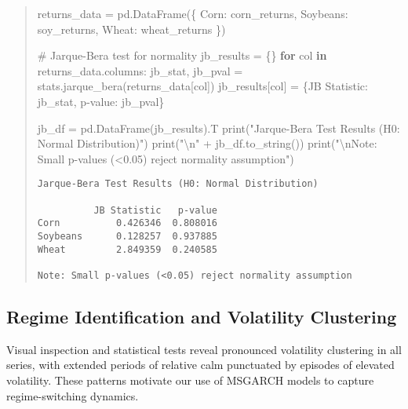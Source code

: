 \documentclass[
  10pt,
  a4paper,
]{article}
\newenvironment{Shaded}{\begin{snugshade}}{\end{snugshade}}
\newcommand{\BuiltInTok}[1]{\textcolor[rgb]{0.00,0.23,0.31}{#1}}
\newcommand{\CharTok}[1]{\textcolor[rgb]{0.13,0.47,0.30}{#1}}
\newcommand{\CommentTok}[1]{\textcolor[rgb]{0.37,0.37,0.37}{#1}}
\newcommand{\ControlFlowTok}[1]{\textcolor[rgb]{0.00,0.23,0.31}{\textbf{#1}}}
\newcommand{\KeywordTok}[1]{\textcolor[rgb]{0.00,0.23,0.31}{\textbf{#1}}}
\newcommand{\NormalTok}[1]{\textcolor[rgb]{0.00,0.23,0.31}{#1}}
\newcommand{\OperatorTok}[1]{\textcolor[rgb]{0.37,0.37,0.37}{#1}}
\newcommand{\StringTok}[1]{\textcolor[rgb]{0.13,0.47,0.30}{#1}}
\begin{document}
\begin{tcolorbox}
\begin{quote}
\begin{Shaded}
\begin{Highlighting}[]
\NormalTok{returns\_data }\OperatorTok{=}\NormalTok{ pd.DataFrame(\{}
    \StringTok{\textquotesingle{}Corn\textquotesingle{}}\NormalTok{: corn\_returns,}
    \StringTok{\textquotesingle{}Soybeans\textquotesingle{}}\NormalTok{: soy\_returns,}
    \StringTok{\textquotesingle{}Wheat\textquotesingle{}}\NormalTok{: wheat\_returns}
\NormalTok{\})}

\CommentTok{\# Jarque{-}Bera test for normality}
\NormalTok{jb\_results }\OperatorTok{=}\NormalTok{ \{\}}
\ControlFlowTok{for}\NormalTok{ col }\KeywordTok{in}\NormalTok{ returns\_data.columns:}
\NormalTok{    jb\_stat, jb\_pval }\OperatorTok{=}\NormalTok{ stats.jarque\_bera(returns\_data[col])}
\NormalTok{    jb\_results[col] }\OperatorTok{=}\NormalTok{ \{}\StringTok{\textquotesingle{}JB Statistic\textquotesingle{}}\NormalTok{: jb\_stat, }\StringTok{\textquotesingle{}p{-}value\textquotesingle{}}\NormalTok{: jb\_pval\}}

\NormalTok{jb\_df }\OperatorTok{=}\NormalTok{ pd.DataFrame(jb\_results).T}
\BuiltInTok{print}\NormalTok{(}\StringTok{"Jarque{-}Bera Test Results (H0: Normal Distribution)"}\NormalTok{)}
\BuiltInTok{print}\NormalTok{(}\StringTok{"}\CharTok{\textbackslash{}n}\StringTok{"} \OperatorTok{+}\NormalTok{ jb\_df.to\_string())}
\BuiltInTok{print}\NormalTok{(}\StringTok{"}\CharTok{\textbackslash{}n}\StringTok{Note: Small p{-}values (\textless{}0.05) reject normality assumption"}\NormalTok{)}
\end{Highlighting}
\end{Shaded}

\begin{verbatim}
Jarque-Bera Test Results (H0: Normal Distribution)

          JB Statistic   p-value
Corn          0.426346  0.808016
Soybeans      0.128257  0.937885
Wheat         2.849359  0.240585

Note: Small p-values (<0.05) reject normality assumption
\end{verbatim}
\end{quote}

\subsection{Regime Identification and Volatility
Clustering}\label{regime-identification-and-volatility-clustering}

Visual inspection and statistical tests reveal pronounced volatility
clustering in all series, with extended periods of relative calm
punctuated by episodes of elevated volatility. These patterns motivate
our use of MSGARCH models to capture regime-switching dynamics.


\end{tcolorbox}
\end{document}

